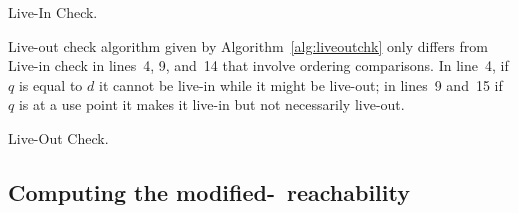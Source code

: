 \begin{algorithm}
\caption{Live-In Check.}
\label{alg:liveinchk}
\end{algorithm}

Live-out check algorithm given by Algorithm~\ref{alg:liveoutchk} only differs from Live-in check in lines~4, 9, and~14 that involve ordering comparisons.
In line~4, if $q$ is equal to $d$ it cannot be live-in while it might be live-out; in lines~9 and~15 if $q$ is at a use point it makes it live-in but not necessarily live-out.

\begin{algorithm}
  \caption{Live-Out Check.}
  \label{alg:liveoutchk}
\end{algorithm}


\subsection{Computing the modified-\reduced\ reachability}

